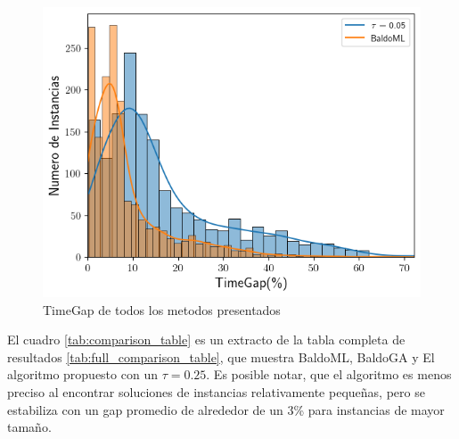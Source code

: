 \documentclass[spanish, a4paper, 12pt, openany,final]{book}
\begin{document}
\begin{figure}[H]
	\centering
	\includegraphics[scale=0.7]{graphs/full_timegap_comparison.png}
	\caption{TimeGap de todos los metodos presentados}
	\label{fig:full_timegap}
\end{figure}



El cuadro \ref{tab:comparison_table} es un extracto de la tabla completa de resultados \ref{tab:full_comparison_table}, que muestra BaldoML, BaldoGA y El algoritmo propuesto con un $\tau=0.25$. Es posible notar, que el algoritmo es menos preciso al encontrar soluciones de instancias relativamente pequeñas, pero se estabiliza con un gap promedio de alrededor de un 3\% para instancias de mayor tamaño.
\end{document}
